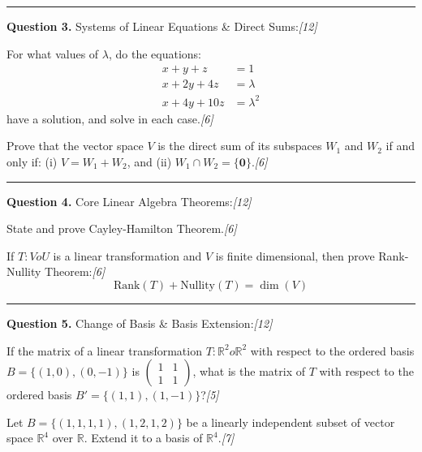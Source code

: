 \documentclass[11pt,a4paper]{article}
\newcommand{\pts}[1]{\hfill   \textit{[#1]}}
\begin{document}
{\medskip\rule{\linewidth}{0.2pt}




\noindent   \textbf{Question 3.} Systems of Linear Equations \& Direct Sums:\pts{12}

\begin{parts}
  \item For what values of $\lambda$, do the equations:
  $$
\begin{aligned} x + y + z &= 1 \\ x + 2y + 4z &= \lambda \\ x + 4y + 10z &= \lambda^2 \end{aligned}$$
  have a solution, and solve in each case.\pts{6}
  \item Prove that the vector space $V$ is the direct sum of its subspaces $W_1$ and $W_2$ if and only if: (i) $V = W_1 + W_2$, and (ii) $W_1 \cap W_2 = \{\mathbf{0}\}$.\pts{6}
\end{parts}

\medskip\rule{\linewidth}{0.2pt}




\noindent   \textbf{Question 4.} Core Linear Algebra Theorems:\pts{12}

\begin{parts}
  \item State and prove Cayley-Hamilton Theorem.\pts{6}
  \item If $T: V  o U$ is a linear transformation and $V$ is finite dimensional, then prove Rank-Nullity Theorem:\pts{6}
  $$ \text{Rank}(T) +  \text{Nullity}(T) = \dim(V)$$
\end{parts}

\medskip\rule{\linewidth}{0.2pt}




\noindent   \textbf{Question 5.} Change of Basis \& Basis Extension:\pts{12}

\begin{parts}
  \item If the matrix of a linear transformation $T: \mathbb{R}^2  o \mathbb{R}^2$ with respect to the ordered basis $B = \{(1,0), (0,-1)\}$ is $
\begin{pmatrix} 1 & 1 \\ 1 & 1 \end{pmatrix}$, what is the matrix of $T$ with respect to the ordered basis $B' = \{(1,1), (1,-1)\}$?\pts{5}
  \item Let $B = \{(1,1,1,1), (1,2,1,2)\}$ be a linearly independent subset of vector space $\mathbb{R}^4$ over $\mathbb{R}$. Extend it to a basis of $\mathbb{R}^4$.\pts{7}
\end{parts}

}
\end{document}
